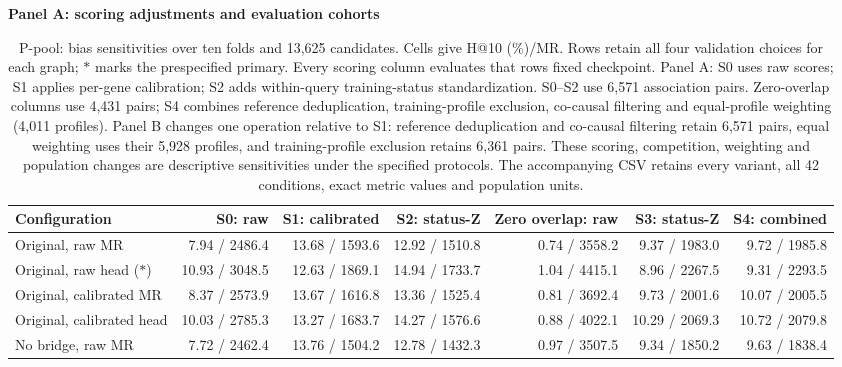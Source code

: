 \begin{landscape}
\begin{table}[p]
\centering\footnotesize
\setlength{\tabcolsep}{3pt}
\caption{P-pool: bias sensitivities over ten folds and 13,625 candidates. Cells give H@10 (\%)/MR. Rows retain all four validation choices for each graph; $\ast$ marks the prespecified primary. Every scoring column evaluates that row\textquotesingle s fixed checkpoint. Panel A: S0 uses raw scores; S1 applies per-gene calibration; S2 adds within-query training-status standardization. S0--S2 use 6,571 association pairs. Zero-overlap columns use 4,431 pairs; S4 combines reference deduplication, training-profile exclusion, co-causal filtering and equal-profile weighting (4,011 profiles). Panel B changes one operation relative to S1: reference deduplication and co-causal filtering retain 6,571 pairs, equal weighting uses their 5,928 profiles, and training-profile exclusion retains 6,361 pairs. These scoring, competition, weighting and population changes are descriptive sensitivities under the specified protocols. The accompanying CSV retains every variant, all 42 conditions, exact metric values and population units.}
\label{tab:matched_bias_PPOOL}
\textbf{Panel A: scoring adjustments and evaluation cohorts}\par\smallskip
\begin{adjustbox}{max width=\linewidth}
\begin{tabular}{lrrrrrr}
\toprule
Configuration & S0: raw & S1: calibrated & S2: status-Z & Zero overlap: raw & S3: status-Z & S4: combined \\
\midrule
Original, raw MR & 7.94 / 2486.4 & 13.68 / 1593.6 & 12.92 / 1510.8 & 0.74 / 3558.2 & 9.37 / 1983.0 & 9.72 / 1985.8 \\
Original, raw head ($\ast$) & 10.93 / 3048.5 & 12.63 / 1869.1 & 14.94 / 1733.7 & 1.04 / 4415.1 & 8.96 / 2267.5 & 9.31 / 2293.5 \\
Original, calibrated MR & 8.37 / 2573.9 & 13.67 / 1616.8 & 13.36 / 1525.4 & 0.81 / 3692.4 & 9.73 / 2001.6 & 10.07 / 2005.5 \\
Original, calibrated head & 10.03 / 2785.3 & 13.27 / 1683.7 & 14.27 / 1576.6 & 0.88 / 4022.1 & 10.29 / 2069.3 & 10.72 / 2079.8 \\
No bridge, raw MR & 7.72 / 2462.4 & 13.76 / 1504.2 & 12.78 / 1432.3 & 0.97 / 3507.5 & 9.34 / 1850.2 & 9.63 / 1838.4 \\

\end{tabular}
\end{adjustbox}
\end{table}
\end{landscape}
